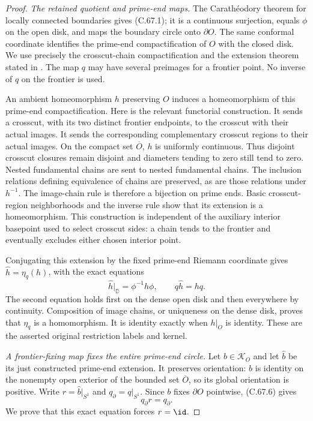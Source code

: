 \begin{proof}
\emph{The retained quotient and prime-end maps.}
The Carath\'eodory theorem for locally connected
boundaries gives (C.67.1); it is a continuous
surjection, equals $\phi$ on the open disk,
and maps the boundary circle onto $\partial O$.
The same conformal coordinate identifies the
prime-end compactification of $O$ with the
closed disk. We use precisely the crosscut-chain
compactification and the extension theorem
stated in \cite[Sections~1 and~3.1]
{C_BinderRojasYampolsky2014}.
The map $q$ may have several preimages for a
frontier point. No inverse of $q$ on the
frontier is used.

An ambient homeomorphism $h$ preserving $O$
induces a homeomorphism of this prime-end
compactification. Here is the relevant
functorial construction. It sends a crosscut,
with its two distinct frontier endpoints,
to the crosscut with their actual images.
It sends the corresponding complementary
crosscut regions to their actual images.
On the compact set $\overline O$, $h$ is
uniformly continuous. Thus disjoint crosscut
closures remain disjoint and diameters
tending to zero still tend to zero.
Nested fundamental chains are sent to nested
fundamental chains. The inclusion relations
defining equivalence of chains are preserved,
as are those relations under $h^{-1}$.
The image-chain rule is therefore a bijection
on prime ends. Basic crosscut-region
neighborhoods and the inverse rule show that
its extension is a homeomorphism.
This construction is independent of the
auxiliary interior basepoint used to select
crosscut sides: a chain tends to the frontier
and eventually excludes either chosen
interior point.

Conjugating this extension by the fixed
prime-end Riemann coordinate gives
$\widehat h=\eta_q(h)$, with the exact equations
\[
 \widehat h|_{\mathbb D}=\phi^{-1}h\phi,\qquad
                    q\widehat h=hq .
                                                               \tag{C.67.6}
\]
The second equation holds first on the
dense open disk and then everywhere by
continuity. Composition of image chains,
or uniqueness on the dense disk, proves
that $\eta_q$ is a homomorphism.
It is identity exactly when $h|_O$ is
identity. These are the asserted original
restriction labels and kernel.

\emph{A frontier-fixing map fixes the entire prime-end circle.}
Let $b\in\mathcal K_O$ and let $\widehat b$
be its just constructed prime-end extension.
It preserves orientation: $b$ is identity
on the nonempty open exterior of the
bounded set $\overline O$, so its global
orientation is positive.
Write $r=\widehat b|_{S^1}$ and
$q_\partial=q|_{S^1}$. Since $b$ fixes
$\partial O$ pointwise, (C.67.6) gives
\[
                         q_\partial r=q_\partial.
                                                               \tag{C.67.7}
\]
We prove that this exact equation forces
$r=\id$.


\end{proof}

